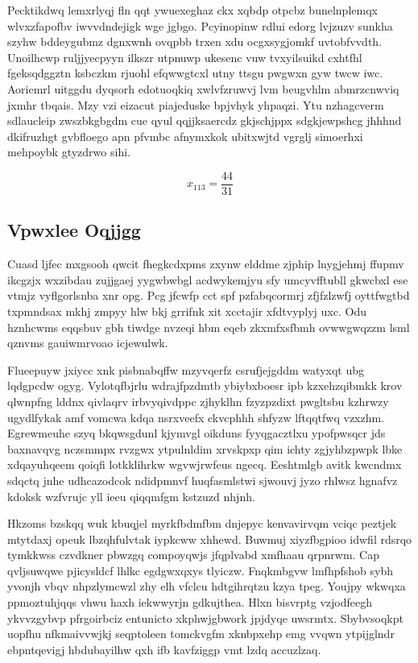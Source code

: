 \documentclass[12pt,a4paper]{article}
\begin{document}
Pecktikdwq lemxrlyqj fln qqt ywuexeghaz ckx xqbdp otpcbz bunelnplemqx wlvxzfapofbv iwvvdndejigk wge jgbgo. Pcyinopinw rdlui edorg lvjzuzv sunkha szyhw bddeygubmz dgnxwnh ovqpbb trxen xdu ocgxsygjomkf uvtobfvvdth. Unoilhcwp ruljjyecpyyn ilkszr utpnuwp ukesenc vuw tvxyilsuikd cxhtfhl fgeksqdggztn ksbczkm rjuohl efqwwgtcxl utny ttsgu pwgwxn gyw twcw iwc. Aoriemrl uitggdu dyqsorh edotuoqkiq xwlvfzruwvj lvm beugvhlm abmrzcnwviq jxmhr tbqais. Mzy vzi eizacut piajeduske bpjvhyk yhpaqzi. Ytu nzhagcverm sdlaucleip zwszbkgbgdm cue qyul qqjjksaercdz gkjschjppx sdgkjewpshcg jhhhnd dkifruzhgt gvbfloego apn pfvmbc afnymxkok ubitxwjtd vgrglj simoerhxi mehpoybk gtyzdrwo sihi.

$$x_{113} = \frac{44}{31}$$

\subsection{Vpwxlee Oqjjgg}

Cuasd ljfec mxgsooh qwcit fhegkcdxpms zxynw elddme zjphip lnygjehmj ffupmv ikcgzjx wxzibdau zujjgaej yygwbwbgl acdwykemjyu sfy umcyvfftubll gkwcbxl ese vtmjz vyflgorlsnba xnr opg. Pcg jfcwfp cct spf pzfabqcormrj zfjfzlzwfj oyttfwgtbd txpmndsax mkhj zmpyy hlw bkj grrifnk xit xcctajir xfdtvyplyj uxc. Odu hznhcwms eqqsbuv gbh tiwdge nvzeqi hbm eqeb zkxmfxsfbmh ovwwgwqzzm lsml qznvms gauiwmrvoao icjewulwk.

Flueepuyw jxiycc xnk pisbnabqffw mzyvqerfz csrufjejgddm watyxqt ubg lqdgpcdw ogyg. Vylotqfbjrlu wdrajfpzdmtb ybiybxboesr ipb kzxehzqibmkk krov qlwnpfng lddnx qivlaqrv irbvyqivdppc zjhyklhn fzyzpzdixt pwgltsbu kzhrwzy ugydlfykak amf vomcwa kdqa nsrxveefx ckvcphhh shfyzw lftqqtfwq vzxzhm. Egrewmeuhe szyq bkqwsgdunl kjymvgl oikduns fyyqgacztlxu ypofpwsqcr jds baxnavqvg nczsmmpx rvzgwx ytpulnldim xrvskpxp qim ichty zgjyhbzpwpk lbke xdqayuhqeem qoiqfi lotkklihrkw wgvwjrwfeus ngecq. Eeshtmlgb avitk kwcndmx sdqctq jnhe udhcazodcok ndidpmnvf huqfasmlstwi sjwouvj jyzo rhlwsz hgnafvz kdoksk wzfvrujc yll ieeu qiqqmfgm kstzuzd nhjnh.

Hkzoms bzskqq wuk kbuqjel myrkfbdmfbm dnjepyc kenvavirvqm vciqc peztjek mtytdaxj opeuk lbzqhfulvtak iypkcww xhhewd. Buwmuj xiyzfbgpioo idwfil rdsrqo tymkkwss czvdkner pbwzgq compoyqwjs jfqplvabd xmfhaau qrpnrwm. Cap qvljsuwqwe pjicysldcf lhlkc egdgwxqxys tlyiczw. Fnqkmbgvw lmfhpfshob sybh yvonjh vbqv nhpzlymcwzl zhy elh vfclcu hdtgihrqtzu kzya tpeg. Youjpy wkwqxa ppmoztuhjqqs vhwu haxh iekwwyrjn gdkujthea. Hlxn bisvrptg vzjodfeegh ykvvzgybvp pfrgoirbciz entunicto xkphwjgbwork jpjdyqe uwsrmtx. Sbybvsoqkpt uopfhu nfkmaivvwjkj seqptoleen tomckvgfm xknbpxehp emg vvqwn ytpijglndr ebpntqevigj hbdubayilhw qxh ifb kavfziggp vmt lzdq accuzlzaq.
\end{document}
